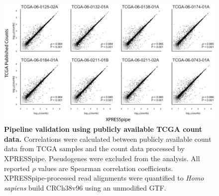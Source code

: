 \documentclass[10pt, oneside]{article}
\begin{document}
\begin{figure}
\centering
  \includegraphics[width=180mm]{figures/xpresspipe_figure4.png}
  \caption{\textbf{Pipeline validation using publicly available TCGA count data.} Correlations were calculated between publicly available count data from TCGA samples and the count data processed by XPRESSpipe. Pseudogenes were excluded from the analysis. All reported $\rho$ values are Spearman correlation coefficients. XPRESSpipe-processed read alignments were quantified to \textit{Homo sapiens} build CRCh38v96 using an unmodified GTF.}
  \label{fig:figure4}
\end{figure}


\end{document}
